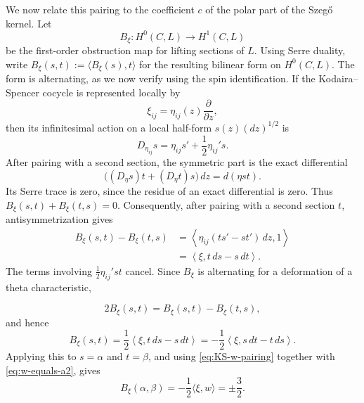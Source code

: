 \documentclass[10pt,a4paper]{amsart}
\begin{document}
We now relate this pairing to the coefficient $c$ of the polar part
of the Szeg\H{o} kernel. Let
\begin{equation*}
B_\xi:H^0(C,L)\longrightarrow H^1(C,L)
\end{equation*}
be the first-order obstruction map for lifting sections of $L$.
{Using Serre duality, write
$B_\xi(s,t):=\langle B_\xi(s),t\rangle$ for the resulting bilinear form
on $H^0(C,L)$.}
{The form is alternating, as we now verify using the spin identification.}
If the Kodaira--Spencer cocycle is represented locally by
\begin{equation*}
\xi_{ij}=\eta_{ij}(z)\frac{\partial}{\partial z},
\end{equation*}
then its infinitesimal action on a local half-form
$s(z)(dz)^{1/2}$ is
\begin{equation*}
D_{\eta_{ij}}s
=
\eta_{ij}s'+\frac12\eta_{ij}'s.
\end{equation*}
{After pairing with a second section, the symmetric part is the
exact differential
\[
\bigl((D_\eta s)t+(D_\eta t)s\bigr)\,dz=d(\eta st).
\]
Its Serre trace is zero, since the residue of an exact differential is
zero. Thus $B_\xi(s,t)+B_\xi(t,s)=0$.}
Consequently, after pairing with a second section $t$,
antisymmetrization gives
\begin{align*}
B_\xi(s,t)-B_\xi(t,s)
&=
\left\langle
\eta_{ij}(ts'-st'){\,dz},1
\right\rangle\\
&=
\left\langle
\xi,t\,ds-s\,dt
\right\rangle.
\end{align*}
The terms involving $\frac12\eta_{ij}'st$ cancel. Since $B_\xi$
is alternating for a deformation of a theta characteristic,


\begin{equation*}
2B_\xi(s,t)=B_\xi(s,t)-B_\xi(t,s),
\end{equation*}
and hence
\begin{equation}
\label{eq:obstruction-wronskian-exact}
{B_\xi(s,t)
=
\frac12\left\langle\xi,t\,ds-s\,dt\right\rangle
=
-\frac12\left\langle\xi,s\,dt-t\,ds\right\rangle.}
\end{equation}
Applying this to $s=\alpha$ and $t=\beta$, and using
\eqref{eq:KS-w-pairing} together with
\eqref{eq:w-equals-a2}, gives
\begin{equation}
\label{eq:B-alpha-beta}
{B_\xi(\alpha,\beta)
=-\frac12\langle\xi,w\rangle
=\pm\frac32.}
\end{equation}
\end{document}
